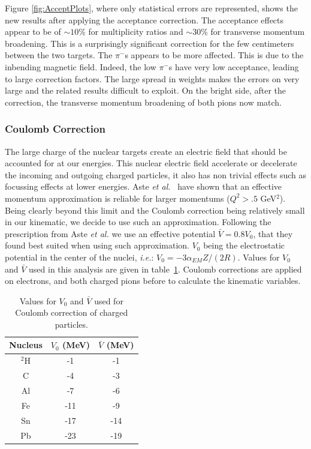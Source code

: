 Figure \ref{fig:AcceptPlots}, where only statistical errors are 
represented, shows the new results after applying the acceptance correction.
The acceptance effects appear to be of $\sim 10$\% for multiplicity ratios and 
$\sim 30$\% for transverse momentum broadening. This is a surprisingly 
significant correction for the few centimeters between the two targets. The 
$\pi^-$s appears to be more affected. This is due to the inbending magnetic 
field. Indeed, the low \pt $\pi^-$s have very low acceptance, leading to large 
correction factors. The large spread in weights makes the errors 
on \dpt very large and the related results difficult to exploit. 
On the bright side, after the correction, the transverse momentum
broadening of both pions now match.

\subsubsection{Coulomb Correction}
\label{CCor}

The large charge of the nuclear targets create an electric field that should 
be accounted for at our energies. This nuclear electric field accelerate or 
decelerate the incoming and outgoing charged particles, it also has non 
trivial effects such as focussing effects at lower energies. Aste {\it et 
al.}~\cite{Aste:2005wc} have shown that an effective momentum approximation is 
reliable for larger momentums ($Q^2>.5$ GeV$^2$). Being clearly beyond this 
limit and the Coulomb correction being relatively small in our kinematic, we 
decide to use such an approximation. Following the prescription from Aste 
{\it et al.} we use an effective potential $\bar V= 0.8 V_0$, that they found 
best suited when using such approximation. $V_0$ being the electrostatic 
potential in the center of the nuclei, {\it i.e.}: $V_0= -3 \alpha_{EM} Z / 
(2 R)$. Values for $V_0$ and $\bar V$ used in this analysis are given in 
table~\ref{tab:Coulomb}. Coulomb corrections are applied on electrons, and
both charged pions before to calculate the kinematic variables.

\begin{table}[htbp]
  \centering
  \begin{tabular}{@{} ccc @{}}
    \hline
Nucleus & $V_0$ (MeV)  &  $\bar V$ (MeV) \\ \hline
$^2$H  & -1  &     -1 \\
C   &  -4 &      -3 \\
Al  &  -7 &      -6 \\
Fe  & -11 &    -9 \\
Sn  & -17 &   -14 \\
Pb  & -23 &   -19 \\
    \hline
  \end{tabular}
  \caption{Values for $V_0$ and $\bar V$ used for Coulomb correction of charged particles.}
  \label{tab:Coulomb}
\end{table}


